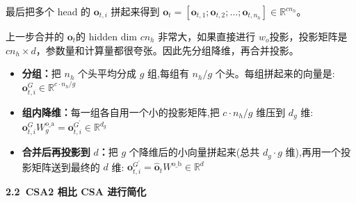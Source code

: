 \documentclass[zihao=false,fontset=windows]{ctexart}
\begin{document}
最后把多个 head 的 $\mathbf o_{t,i}$ 拼起来得到 $\mathbf o_t=[\mathbf o_{t,1};\mathbf o_{t,2};\ldots;\mathbf o_{t,n_h}]\in\mathbb{R}^{cn_h}$。\par

\par{}\vspace{0.8em}\par\vspace{0.28em}

上一步合并的 $\mathbf o_t$的 hidden dim $cn_h$ 非常大，如果直接进行 $w_o$投影，投影矩阵是 $cn_h\times d$，参数量和计算量都很夸张。因此先分组降维，再合并投影。\par
\begin{itemize}
\item 
\textbf{分组：}把 $n_h$ 个头平均分成 $g$ 组,每组有 $n_h/g$ 个头。每组拼起来的向量是: $\mathbf o_{t,i}^G\in\mathbb R^{c\cdot n_h/g}$\par
\item 
\textbf{组内降维：}每一组各自用一个小的投影矩阵,把 $c\cdot n_h/g$ 维压到 $d_g$ 维:$\mathbf o_{t,i}^GW_g^{\mathrm{o\_a}}=\mathbf o_{t,i}^{G^{\prime}}\in\mathbb R^{d_g}$\par
\item 
\textbf{合并后再投影到 }$d$\textbf{：}把 $g$ 个降维后的小向量拼起来(总共 $d_g\cdot g$ 维),再用一个投影矩阵送到最终的 $d$ 维: $\mathbf o_{t,i}^{G^{\prime}}=\widehat{\mathbf o}_tW^{\mathrm{o\_b}}\in\mathbb R^d$\par
\end{itemize}


\par{}\vspace{0.8em}\noindent \begin{tcolorbox}[boxrule=0pt,arc=3pt,colback=callOrange,left=3pt,right=3pt,top=2pt,bottom=2pt,before skip=0pt,after skip=0pt]{\bfseries \textcolor{feishuBlue}{2.2}\ CSA2 相比 CSA 进行简化}\end{tcolorbox}\par\vspace{0.28em}
\end{document}
